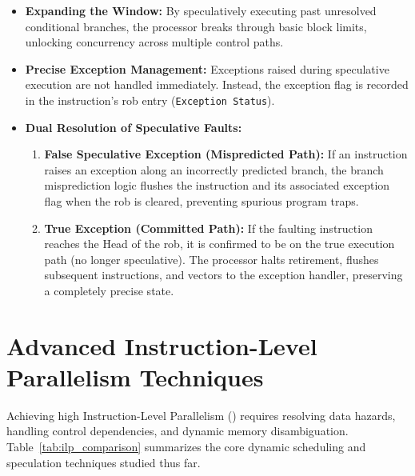 \begin{itemize}
    \item \textbf{Expanding the  Window:} By speculatively executing past unresolved conditional branches, the processor breaks through basic block limits, unlocking concurrency across multiple control paths.
    \item \textbf{Precise Exception Management:} Exceptions raised during speculative execution are not handled immediately. Instead, the exception flag is recorded in the instruction's \gls{rob} entry (\texttt{Exception Status}).
    \item \textbf{Dual Resolution of Speculative Faults:}
    \begin{enumerate}
        \item \textbf{False Speculative Exception (Mispredicted Path):} If an instruction raises an exception along an incorrectly predicted branch, the branch misprediction logic flushes the instruction and its associated exception flag when the \gls{rob} is cleared, preventing spurious program traps.
        \item \textbf{True Exception (Committed Path):} If the faulting instruction reaches the Head of the \gls{rob}, it is confirmed to be on the true execution path (no longer speculative). The processor halts retirement, flushes subsequent instructions, and vectors to the exception handler, preserving a completely precise state.
    \end{enumerate}
\end{itemize}


\section{Advanced Instruction-Level Parallelism Techniques}
\label{sec:advanced_ilp_techniques}

Achieving high Instruction-Level Parallelism () requires resolving data hazards, handling control dependencies, and dynamic memory disambiguation. Table~\ref{tab:ilp_comparison} summarizes the core dynamic scheduling and speculation techniques studied thus far.

